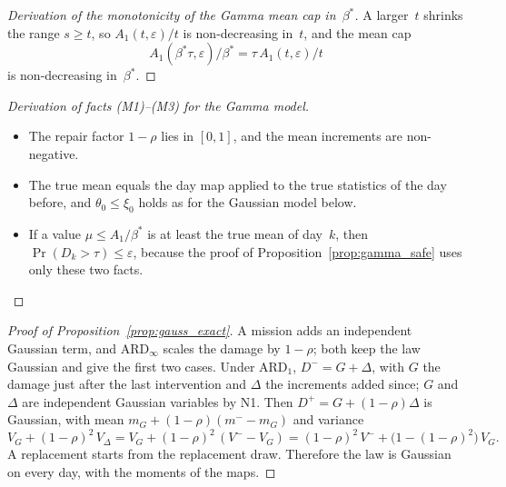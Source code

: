 \documentclass[11pt,a4paper]{article}
\theoremstyle{plain}
\theoremstyle{definition}
\theoremstyle{remark}
\begin{document}
\label{drv:gamma_beta}
\begin{proof}[Derivation of the monotonicity of the Gamma mean cap in~$\beta^*$]
A larger~$t$ shrinks the range $s \ge t$, so $A_1(t, \varepsilon)/t$ is non-decreasing in~$t$, and the mean cap
\begin{equation}
  A_1(\beta^*\tau, \varepsilon)/\beta^* = \tau\, A_1(t, \varepsilon)/t
\end{equation}
is non-decreasing in~$\beta^*$.
\end{proof}

\label{drv:mfacts_gamma}
\begin{proof}[Derivation of facts (M1)--(M3) for the Gamma model]
\begin{itemize}
  \item[(M1)] The repair factor $1-\rho$ lies in $[0, 1]$, and the mean increments are non-negative.
  \item[(M2)] The true mean equals the day map applied to the true statistics of the day before, and $\theta_0 \le \xi_0$ holds as for the Gaussian model below.
  \item[(M3)] If a value $\mu \le A_1/\beta^*$ is at least the true mean of day~$k$, then $\Pr(D_k > \tau) \le \varepsilon$, because the proof of Proposition~\ref{prop:gamma_safe} uses only these two facts.
\end{itemize}
\end{proof}

\label{prf:prop:gauss_exact}
\begin{proof}[Proof of Proposition~\ref{prop:gauss_exact}]
A mission adds an independent Gaussian term, and $\text{ARD}_\infty$ scales the damage by $1-\rho$; both keep the law Gaussian and give the first two cases.
Under $\text{ARD}_1$, $D^- = G + \Delta$, with $G$ the damage just after the last intervention and $\Delta$ the increments added since; $G$ and $\Delta$ are independent Gaussian variables by N1.
Then $D^+ = G + (1-\rho)\Delta$ is Gaussian, with mean $m_G + (1-\rho)(m^- - m_G)$ and variance
\begin{equation}
  V_G + (1-\rho)^2\, V_\Delta = V_G + (1-\rho)^2\,(V^- - V_G) = (1-\rho)^2\, V^- + \bigl(1 - (1-\rho)^2\bigr)\, V_G .
\end{equation}
A replacement starts from the replacement draw.
Therefore the law is Gaussian on every day, with the moments of the maps.
\end{proof}
\end{document}
